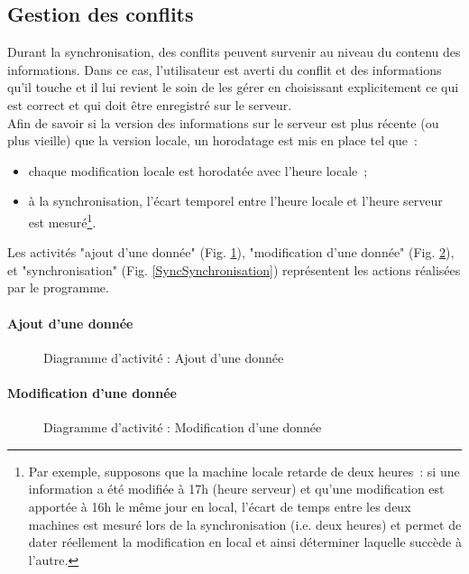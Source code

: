 \subsection{Gestion des conflits}
Durant la synchronisation, des conflits peuvent survenir au niveau du contenu des informations.
Dans ce cas, l'utilisateur est averti du conflit et des informations qu'il touche et il lui revient le soin de les gérer en choisissant explicitement ce qui est correct et qui doit être enregistré sur le serveur.
\\
Afin de savoir si la version des informations sur le serveur est plus récente (ou plus vieille) que la version locale, un horodatage est mis en place tel que~:
\begin{itemize}
    \item chaque modification locale est horodatée avec l'heure locale~;
    \item à la synchronisation, l'écart temporel entre l'heure locale et l'heure serveur est mesuré\footnote{Par exemple, supposons que la machine locale retarde de deux heures~: si une information a été modifiée à 17h (heure serveur) et qu'une modification est apportée à 16h le même jour en local, l'écart de temps entre les deux machines est mesuré lors de la synchronisation (i.e. deux heures) et permet de dater réellement la modification en local et ainsi déterminer laquelle succède à l'autre.}.
\end{itemize}
Les activités "ajout d'une donnée" (Fig. \ref{SyncAddData}), "modification d'une donnée" (Fig. \ref{SyncModifData}), et "synchronisation" (Fig. \ref{SyncSynchronisation}) représentent les actions réalisées par le programme.

\newpage
\paragraph{Ajout d'une donnée}
\begin{bigcenter}
    \begin{figure}[h]
        \centering
        \scalebox{0.7}{}
        \caption{Diagramme d'activité : Ajout d'une donnée}
        \label{SyncAddData}
    \end{figure}
\end{bigcenter}

\newpage
\paragraph{Modification d'une donnée}
\begin{bigcenter}
    \begin{figure}[h]
        \centering
        \scalebox{0.7}{}
        \caption{Diagramme d'activité : Modification d'une donnée}
        \label{SyncModifData}
    \end{figure}
\end{bigcenter}

